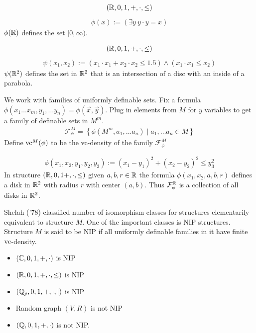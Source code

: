 \documentclass{beamer}
\newcommand{\F}{\mathcal F}
\newcommand{\curly}[1]{\left\{ #1 \right\}}
\newcommand{\paren}[1]{\left( #1 \right)}
\begin{document}
\begin{frame}
	\begin{align*}
		(\mathbb{R}, 0, 1, +, \cdot, \leq)
	\end{align*}
	\begin{align*}
		\phi(x) := \paren{\exists y \ y \cdot y = x}
	\end{align*}
	$\phi(\mathbb{R})$ defines the set $[0, \infty)$.
\end{frame}

\begin{frame}
	\begin{align*}
		(\mathbb{R}, 0, 1, +, \cdot, \leq)
	\end{align*}
	\begin{align*}
		\psi(x_1, x_2) := (x_1 \cdot x_1 + x_2 \cdot x_2 \leq 1.5) \wedge (x_1\cdot x_1 \leq x_2)
	\end{align*}
	$\psi(\mathbb{R}^2)$ defines the set in $\mathbb{R}^2$ that is an intersection of a disc with an inside of a parabola.
\end{frame}

\begin{frame}
	We work with families of uniformly definable sets.
	Fix a formula $\phi(x_1 \ldots x_m, y_1, \ldots y_n) = \phi(\vec x, \vec y)$.
	Plug in elements from $M$ for $y$ variables to get a family of definable sets in $M^m$.
	\begin{align*}
		\F^M_\phi = \curly{\phi(M^m, a_1, \ldots a_n) \mid a_1, \ldots a_n \in M}
	\end{align*}
	Define $\operatorname{vc}^M(\phi)$ to be the vc-density of the family $\F^M_\phi$ \\
\end{frame}

\begin{frame}
	\begin{align*}
		\phi(x_1, x_2, y_1, y_2, y_3) := (x_1 - y_1)^2 + (x_2 - y_2)^2 \leq y_3^2
	\end{align*}
	In structure $(\mathbb{R}, 0, 1 +, \cdot, \leq)$ given $a,b,r \in \mathbb{R}$ the formula $\phi(x_1, x_2, a, b, r)$ defines a disk in $\mathbb{R}^2$ with radius $r$ with center $(a,b)$.
	Thus $\F^\R_\phi$ is a collection of all disks in $\mathbb{R}^2$.
\end{frame}

\begin{frame}
	Shelah ('78) classified number of isomorphism classes for structures elementarily equivalent to structure $M$.
	One of the important classes is NIP structures.
	Structure $M$ is said to be NIP if all uniformly definable families in it have finite $\operatorname{vc}$-density.
	\begin{itemize}
		\item $(\mathbb{C}, 0, 1, +, \cdot)$ is NIP
		\item $(\mathbb{R}, 0, 1, +, \cdot, \leq)$ is NIP
		\item $(\mathbb{Q}_p, 0, 1, +, \cdot, \mid)$ is NIP
		\item Random graph $(V, R)$ is not NIP
		\item $(\mathbb{Q}, 0, 1, +, \cdot)$ is not NIP.
	\end{itemize}
\end{frame}
\end{document}
